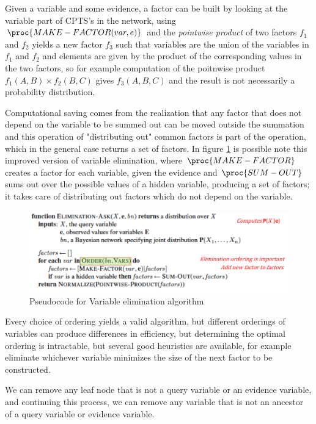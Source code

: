 Given a variable and some evidence, a factor can be built by looking at the variable part
of CPTS’s in the network, using $\proc{MAKE-FACTOR(var, e)}$ and the 
\emph{pointwise product} of two factors $f_1$ and $f_2$ yields a new factor $f_3$
such that variables are the union of the variables in $f_1$ and $f_2$ and
elements are given by the product of the corresponding values in the two factors, so
for example computation of the poitnwise product $f_1(A, B) \times f_2(B, C)$ gives
$f_3(A, B, C)$ and the result is not necessarily a probability distribution.

Computational saving comes from the realization that any factor that does not depend
on the variable to be summed out can be moved outside the summation and this operation
of "distributing out" common factors is part of the operation, which in
the general case returns a set of factors.\newline
In figure \ref{img:improvedEliminationAsk} is possible note this improved version of 
variable elimination, where $\proc{MAKE-FACTOR}$ creates a factor for each variable,
given the evidence and $\proc{SUM-OUT}$ sums out over the possible values of a hidden variable,
producing a set of factors; it takes care of distributing out factors 
which do not depend on the variable.

\begin{figure}
	\includegraphics[width=\textwidth]{Images/variableElimination}
	\caption{Pseudocode for Variable elimination algorithm}
	\label{img:improvedEliminationAsk}
\end{figure}
Every choice of ordering yields a valid algorithm, but different orderings of variables
can produce differences in efficiency, but determining the optimal ordering is intractable,
but several good heuristics are available, for example eliminate whichever
variable minimizes the size of the next factor to be constructed.

We can remove any leaf node that is not a query variable or an evidence variable, and 
continuing this process, we can remove any variable that is not an ancestor of a query
variable or evidence variable.

